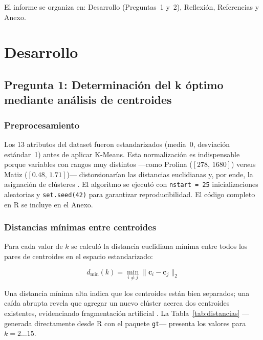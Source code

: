 \documentclass[10pt]{article}
\begin{document}
El informe se organiza en: Desarrollo (Preguntas~1 y~2), Reflexi\'on, Referencias
y Anexo.

\section{Desarrollo}

\subsection{Pregunta 1: Determinaci\'on del k \'optimo mediante an\'alisis de centroides}

\subsubsection{Preprocesamiento}

Los 13 atributos del dataset fueron estandarizados (media~0, desviaci\'on est\'andar~1)
antes de aplicar K-Means.
Esta normalizaci\'on es indispensable porque variables con rangos muy distintos ---como
Prolina ($[278,\,1680]$) versus Matiz ($[0.48,\,1.71]$)--- distorsionar\'ian las
distancias euclidianas y, por ende, la asignaci\'on de cl\'usteres
\citep{james2021introduction}.
El algoritmo se ejecut\'o con \texttt{nstart\,=\,25} inicializaciones aleatorias y
\texttt{set.seed(42)} para garantizar reproducibilidad.
El c\'odigo completo en R se incluye en el Anexo.

\subsubsection{Distancias m\'inimas entre centroides}

Para cada valor de $k$ se calcul\'o la distancia euclidiana m\'inima entre todos los
pares de centroides en el espacio estandarizado:

\begin{equation}
  d_{\min}(k) = \min_{i \neq j} \| \mathbf{c}_i - \mathbf{c}_j \|_2
  \label{eq:dmin}
\end{equation}

Una distancia m\'inima alta indica que los centroides est\'an bien separados; una
ca\'ida abrupta revela que agregar un nuevo cl\'uster acerca dos centroides existentes,
evidenciando fragmentaci\'on artificial \citep{james2021introduction}.
La Tabla~\ref{tab:distancias} ---generada directamente desde R con el paquete
\texttt{gt}--- presenta los valores para $k = 2\ldots15$.
\end{document}
